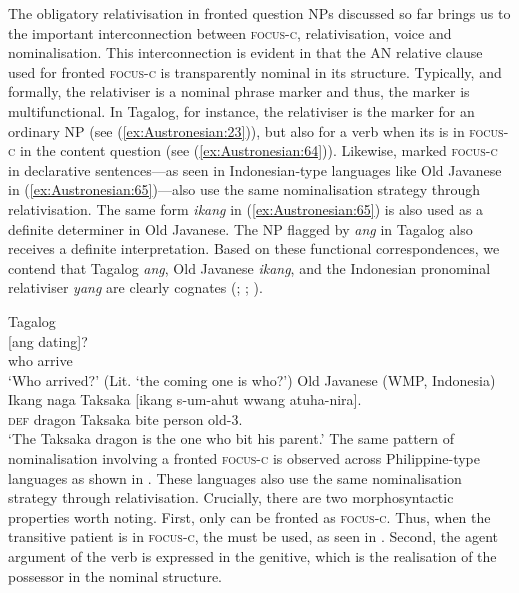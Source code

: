 \documentclass[output=paper,chinesefont]{../langscibook}
\begin{document}
The obligatory relativisation in fronted question NPs discussed so far brings us to the important interconnection between \textsc{focus-c}, relativisation, voice and nominalisation. This interconnection is evident in that the AN relative clause used for fronted \textsc{focus-c} is transparently nominal in its structure. Typically, and formally, the relativiser is a nominal phrase marker and thus, the marker is multifunctional. In Tagalog, for instance, the relativiser is the \NOM marker for an ordinary NP (see (\ref{ex:Austronesian:23})), but also for a verb when its \SUBJ is in \textsc{focus-c} in the content question (see (\ref{ex:Austronesian:64})). Likewise, marked \textsc{focus-c} in declarative sentences—as seen in Indonesian-type languages like Old Javanese in (\ref{ex:Austronesian:65})—also use the same nominalisation strategy through relativisation. The same form \emph{ikang} in (\ref{ex:Austronesian:65}) is also used as a definite determiner in Old Javanese. The NP flagged by \emph{ang} in Tagalog also receives a definite interpretation. Based on these functional correspondences, we contend that Tagalog \emph{ang}, Old Javanese \emph{ikang}, and the Indonesian pronominal relativiser \emph{yang} are clearly cognates (\citealt[266--267]{Kahler1974}; \citealt[465]{Blust2015}; \citealt[228--229]{Kaufman2018}).

\ea\label{ex:Austronesian:64} Tagalog  \citep[219]{Kaufman2018}\\\gll
[Sino]\textsubscript{\PRED} [ang dating]\textsubscript{\SUBJ}? \\
 \phantom{[}who \phantom{[}{\NOM} \textlangle\AV{\textrangle}arrive\\
\glt`Who arrived?' (Lit. `the coming one is who?')
\z
\ea\label{ex:Austronesian:65} Old Javanese (WMP, Indonesia)  \citep[150]{Erawati2014}\\\gll
Ikang naga Taksaka [ikang s-um-ahut wwang atuha-nira]. \\
\textsc{def} dragon Taksaka {\REL} \textlangle{\AV}{\textrangle}bite person old-3\SG.\POSS\\
\glt`The Taksaka dragon is the one who bit his parent.'
\z
The same pattern of nominalisation involving a fronted \textsc{focus-c} is observed across Philippine-type languages as shown in . These languages also use the same nominalisation strategy through relativisation. Crucially, there are two morphosyntactic properties worth noting. First, only \SUBJ can be fronted as \textsc{focus-c}. Thus, when the transitive patient is in \textsc{focus-c}, the \PV must be used, as seen in . Second, the agent argument of the \PV verb is expressed in the genitive, which is the realisation of the possessor in the nominal structure.
\end{document}
